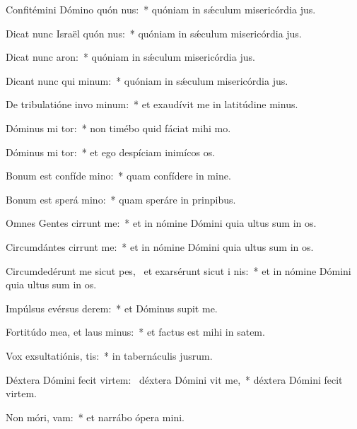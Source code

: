 \item Confitémini Dómino quón nus:~* quóniam in sǽculum misericórdia jus.
\item Dicat nunc Israël quón nus:~* quóniam in sǽculum misericórdia jus.
\item Dicat nunc  aron:~* quóniam in sǽculum misericórdia jus.
\item Dicant nunc qui  minum:~* quóniam in sǽculum misericórdia jus.
\item De tribulatióne invo minum:~* et exaudívit me in latitúdine minus.
\item Dóminus mi tor:~* non timébo quid fáciat mihi mo.
\item Dóminus mi tor:~* et ego despíciam inimícos os.
\item Bonum est confíde  mino:~* quam confídere in mine.
\item Bonum est sperá  mino:~* quam speráre in prinpibus.
\item Omnes Gentes cirrunt me:~* et in nómine Dómini quia ultus sum in os.
\item Circumdántes cirrunt me:~* et in nómine Dómini quia ultus sum in os.
\item Circumdedérunt me sicut pes,~\pscross{} et exarsérunt sicut i  nis:~* et in nómine Dómini quia ultus sum in os.
\item Impúlsus evérsus   derem:~* et Dóminus supit me.
\item Fortitúdo mea, et laus  minus:~* et factus est mihi in satem.
\item Vox exsultatiónis,  tis:~* in tabernáculis jusrum.
\item Déxtera Dómini fecit virtem:~\pscross{} déxtera Dómini vit me,~* déxtera Dómini fecit virtem.
\item Non móri,  vam:~* et narrábo ópera mini.

